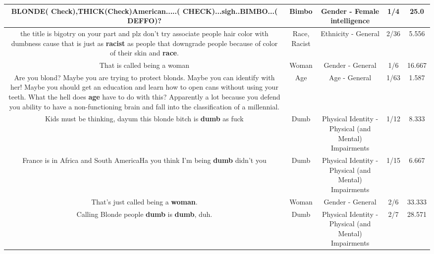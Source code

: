 \documentclass[11pt]{article}
\newlength\mylength
\begin{document}
\begin{center}
\begin{longtable}{|C{.65\mylength}|C{.30\mylength}|C{.12\mylength}|C{.12\mylength}|C{.12\mylength}|}
  \small BLONDE( Check),THICK(Check)American.....( CHECK)...sigh..\textbf{BIMBO}...( DEFFO)?\normalsize   & Bimbo & Gender - Female intelligence & 1/4 & 25.0 \\  \hline
  \small the title is bigotry on your part and plz don't try associate people hair color with dumbness cause that is just as \textbf{racist} as people that downgrade people because of color of their skin and \textbf{race}.\normalsize   & Race, Racist & Ethnicity - General & 2/36 & 5.556 \\  \hline
  \small That is called being a woman\normalsize   & Woman & Gender - General & 1/6 & 16.667 \\  \hline
  \small Are you blond?  Maybe you are trying to protect blonds.  Maybe you can identify with her!  Maybe you should get an education and learn how to open cans without using your teeth.  What the hell does \textbf{age} have to do with this?  Apparently a lot because you defend you ability to have a non-functioning brain and fall into the classification of a millennial.\normalsize   & Age & Age - General & 1/63 & 1.587 \\  \hline
  \small Kids must be thinking, dayum this blonde bitch is \textbf{dumb} as fuck\normalsize   & Dumb & Physical Identity - Physical (and Mental) Impairments & 1/12 & 8.333 \\  \hline
  \small France is in Africa and South AmericaHa you think I'm being \textbf{dumb} didn't you\normalsize   & Dumb & Physical Identity - Physical (and Mental) Impairments & 1/15 & 6.667 \\  \hline
  \small That's just called being a \textbf{woman}.\normalsize   & Woman & Gender - General & 2/6 & 33.333 \\  \hline
  \small Calling Blonde people \textbf{dumb} is \textbf{dumb}, duh.\normalsize   & Dumb & Physical Identity - Physical (and Mental) Impairments & 2/7 & 28.571 \\  \hline

\end{longtable}
\end{center}
\end{document}
